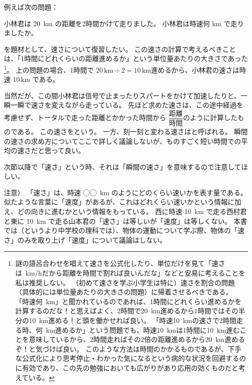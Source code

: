 例えば次の問題：
\begin{screen}
  小林君は 20~km の距離を2時間かけて走りました。
  小林君は時速何 km で走りましたか。
\end{screen}
を題材として、速さについて復習したい。
この速さの計算で考えるべきことは、「1時間にどれくらいの距離進めるか」という単位量あたりの大きさであった\footnote{%
  謎の語呂合わせを唱えて速さを公式化したり、単位だけを見て「速さは~km/hだから距離を時間で割れば良いんだな」などと安易に考えることを私は推奨しない。
  （初めて速さを学ぶ小学生は特に）速さを割合の問題（具体的には単位量あたりの大きさの問題）に帰着させるべきである。
  「時速何~km」と聞かれているのであれば、1時間にどれくらい進めるかを計算するのだな！と思えばよく、2時間で20~km進めるから1時間ではその半分の10~km進める！と頭を働かせれば良い。
  「時速10~kmの速さで2時間走る時、何~km進めるか」という問題でも、時速10~kmは1時間に10~km進むことを意味しているから、2時間走ればその2倍の距離進めるから20~km進めるぞ！と気づけば良い。
  このような方法は時間のかかるものであるが、下手な公式化により思考停止・わかった気になるという病的な状況を回避するのに有効であり、この先の勉強においても広がりがあり応用の効くものだと考えている。
}。
上の問題の場合、1時間で $20\,\mathrm{km} \div 2 = 10\,\mathrm{km}$進めるから、小林君の速さは時速 $10\,\mathrm{km}$ である。

当然だが、この間小林君は信号で止まったりスパートをかけて加速したりと、一瞬一瞬で速さを変えながら走っている。
先ほど求めた速さは、この途中経過を考慮せず、トータルで走った距離とかかった時間から $\dfrac{\text{距離}}{\text{時間}}$のように計算したものである。
この速さをという。
一方、刻一刻と変わる速さはと呼ばれる。
瞬間の速さの求め方についてここで詳しく議論しないが、ものすごく短い時間での平均の速さだと思って良い。

次節以降で「速さ」という時、それは「瞬間の速さ」を意味するので注意してほしい。

{\small%
  \noindent
  注意）
  「速さ」は、時速 ◯◯~km のようにどのくらい速いかを表す量である。
  似たような言葉に「速度」があるが、これはどれくらい速いかという情報に加え、どの向きに進むかという情報をもっている。
  西に時速 10~km で走る西村君と東に 10~km で走る山本君の「速さ」は等しいが「速度」は等しくない。
  本書では（というより中学校の理科では）、物体の運動について学ぶ際、物体の「速さ」のみを取り上げ「速度」について議論はしない。
}
